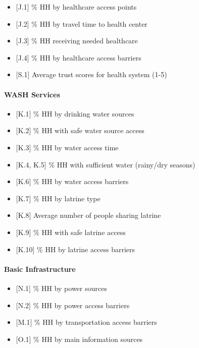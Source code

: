 \documentclass[
]{report}
\providecommand{\tightlist}{%
  \setlength{\itemsep}{0pt}\setlength{\parskip}{0pt}}
\begin{document}
\begin{itemize}
\tightlist
\item
  {[}J.1{]} \% HH by healthcare access points
\item
  {[}J.2{]} \% HH by travel time to health center
\item
  {[}J.3{]} \% HH receiving needed healthcare
\item
  {[}J.4{]} \% HH by healthcare access barriers
\item
  {[}S.1{]} Average trust scores for health system (1-5)
\end{itemize}

\paragraph{WASH Services}\label{wash-services}

\begin{itemize}
\tightlist
\item
  {[}K.1{]} \% HH by drinking water sources
\item
  {[}K.2{]} \% HH with safe water source access
\item
  {[}K.3{]} \% HH by water access time
\item
  {[}K.4, K.5{]} \% HH with sufficient water (rainy/dry seasons)
\item
  {[}K.6{]} \% HH by water access barriers
\item
  {[}K.7{]} \% HH by latrine type
\item
  {[}K.8{]} Average number of people sharing latrine
\item
  {[}K.9{]} \% HH with safe latrine access
\item
  {[}K.10{]} \% HH by latrine access barriers
\end{itemize}

\paragraph{Basic Infrastructure}\label{basic-infrastructure}

\begin{itemize}
\tightlist
\item
  {[}N.1{]} \% HH by power sources
\item
  {[}N.2{]} \% HH by power access barriers
\item
  {[}M.1{]} \% HH by transportation access barriers
\item
  {[}O.1{]} \% HH by main information sources
\end{itemize}
\end{document}
